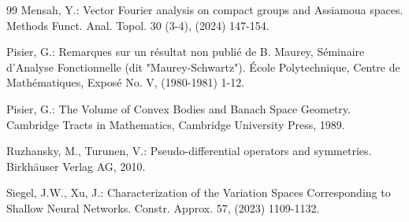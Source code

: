 \documentclass[12pt]{amsart}%
\begin{document}
\begin{thebibliography}{99}
  Mensah, Y.: Vector Fourier analysis on compact groups and Assiamoua spaces. Methods Funct. Anal. Topol. 30 (3-4), (2024) 147-154.

 Pisier, G.: Remarques sur un r\'esultat non publi\'e de B. Maurey, S\'eminaire d'Analyse Fonctionnelle (dit "Maurey-Schwartz"). \'Ecole Polytechnique,
     Centre de Math\'ematiques, Expos\'e No. V, (1980-1981) 1-12.
     
     
 Pisier,  G.: The Volume of Convex Bodies and Banach Space Geometry. Cambridge Tracts in Mathematics, Cambridge University Press, 1989.

  Ruzhansky, M.,  Turunen, V.:  Pseudo-differential operators and symmetries. Birkh\"auser Verlag AG, 2010. 

Siegel, J.W., Xu, J.:  Characterization of the Variation Spaces Corresponding to Shallow Neural Networks. Constr. Approx. 57,  (2023) 1109-1132. 
\end{thebibliography}
\end{document}
